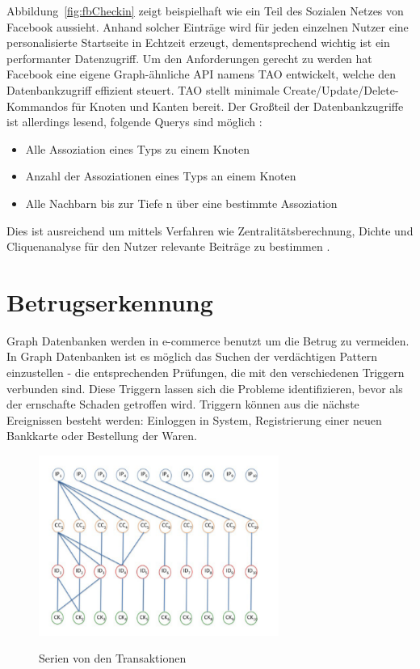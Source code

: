 Abbildung~\ref{fig:fbCheckin} zeigt beispielhaft wie ein Teil des Sozialen Netzes von Facebook aussieht. Anhand solcher Einträge wird für jeden einzelnen Nutzer eine personalisierte Startseite in Echtzeit erzeugt, dementsprechend wichtig ist ein performanter Datenzugriff. Um den Anforderungen gerecht zu werden hat Facebook eine eigene Graph-ähnliche API namens TAO entwickelt, welche den Datenbankzugriff effizient steuert. TAO stellt minimale Create/Update/Delete-Kommandos für Knoten und Kanten bereit. Der Großteil der Datenbankzugriffe ist allerdings lesend, folgende Querys sind möglich \cite{facebookTao}:
\begin{itemize}
	\item Alle Assoziation eines Typs zu einem Knoten
	\item Anzahl der Assoziationen eines Typs an einem Knoten
	\item Alle Nachbarn bis zur Tiefe n über eine bestimmte Assoziation
\end{itemize}
Dies ist ausreichend um mittels Verfahren wie Zentralitätsberechnung, Dichte und Cliquenanalyse für den Nutzer relevante Beiträge zu bestimmen \cite{sozialeNetzwerkanalyse}.


\section{Betrugserkennung}
Graph Datenbanken werden in e-commerce benutzt um die Betrug zu vermeiden. In Graph Datenbanken ist es möglich das Suchen der verdächtigen Pattern einzustellen - die entsprechenden Prüfungen, die mit den verschiedenen Triggern verbunden sind. Diese Triggern lassen sich die Probleme identifizieren, bevor als der ernschafte Schaden getroffen wird. Triggern können aus die nächste Ereignissen besteht werden: Einloggen in System, Registrierung einer neuen Bankkarte oder Bestellung der Waren.

\begin{figure}
	\caption{Serien von den Transaktionen}
	\cite{Betrugserkennung}
	\label{fig:Trs}
	\centering
	\includegraphics[width=0.7\textwidth]{images/Betrugserkennung.png}
\end{figure}

